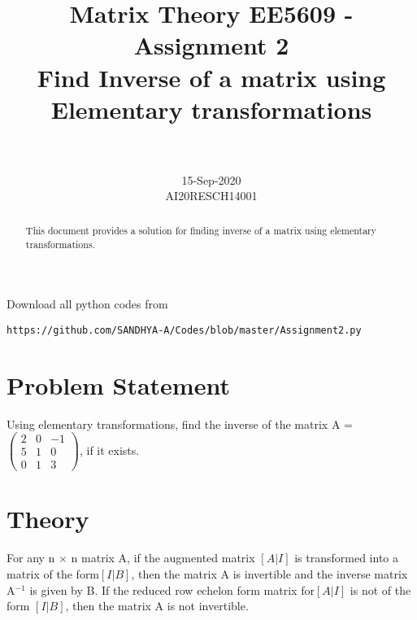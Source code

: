 \documentclass[journal,12pt,twocolumn]{IEEEtran}
\newcommand{\myvec}[1]{\ensuremath{\begin{pmatrix}#1\end{pmatrix}}}
\begin{document}
\title{Matrix Theory EE5609 - Assignment 2\\
Find Inverse of a matrix using Elementary transformations
}

\author{\\
 \\
15-Sep-2020\\
AI20RESCH14001\\
 }

\maketitle
\begin{abstract}
This document provides a solution for finding inverse of a matrix using elementary transformations.
\end{abstract}

Download all python codes from 
\begin{lstlisting}
https://github.com/SANDHYA-A/Codes/blob/master/Assignment2.py
\end{lstlisting}


\section{Problem Statement}
Using elementary transformations, find the inverse of the matrix  A = $\myvec{2 &0 &-1\\5 &1 &0\\0 &1 &3} $, if it exists.

\section{Theory}
For any n $\times$  n matrix A, if the augmented matrix $ [A | I]$ is transformed into a matrix of the form$ [I|B]$, then the matrix A is invertible and the inverse matrix A$^{-1}$ is given by B. If the reduced row echelon form matrix for$ [A | I]$ is not of the form $[ I | B]$, then the matrix A is not invertible.
\end{document}
